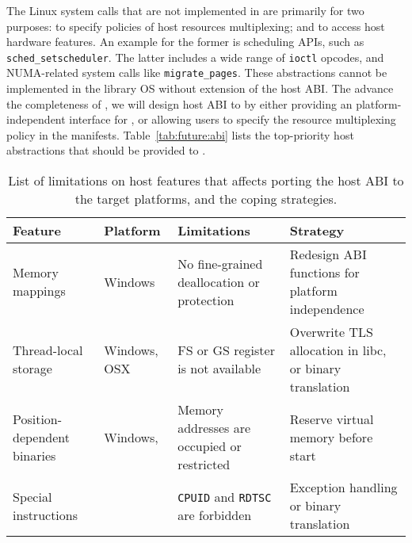 The Linux system calls that are not implemented in \graphene{}
are primarily for two purposes:
to specify policies of host resources multiplexing;
and to access host hardware features.
An example for the former is scheduling APIs, such as {\tt sched\_setscheduler}.
The latter includes
a wide range of {\tt ioctl} opcodes,
and NUMA-related system calls like {\tt migrate\_pages}.
These abstractions cannot be implemented in the library OS
without extension of the host ABI.
The advance the completeness of \graphene{},
we will design host ABI to by
either providing an platform-independent interface
for \picoprocs{},
or allowing users to specify the resource multiplexing policy in the manifests.
Table~\ref{tab:future:abi} lists the top-priority host abstractions
that should be provided to \picoprocs{}.


\begin{table}[t]
\footnotesize
\centering
\begin{tabular}{|p{1.2in}|>{\raggedright\arraybackslash}p{0.8in}|>{\raggedright\arraybackslash}p{1.6in}|>{\raggedright\arraybackslash}p{2.2in}|}
\hline
{\bf Feature} & {\bf Platform} & {\bf Limitations} & {\bf Strategy} \\
\hline
Memory mappings & Windows & No fine-grained deallocation or protection & Redesign ABI functions for platform independence \\
\hline
Thread-local storage & Windows, OSX & FS or GS register is not available & Overwrite TLS allocation in libc, or binary translation \\
\hline
Position-dependent binaries & Windows, \sgx{} & Memory addresses are occupied or restricted & Reserve virtual memory before \picoprocs{} start \\
\hline
Special instructions & \sgx{} & {\tt CPUID} and {\tt RDTSC} are forbidden & Exception handling or binary translation \\
\hline
\end{tabular}
\caption[List of platform limitations affecting host ABI porting]
{List of limitations on host features that affects porting the host ABI to the target platforms,
and the coping strategies.}
\label{tab:future:abi-limit}
\end{table}

